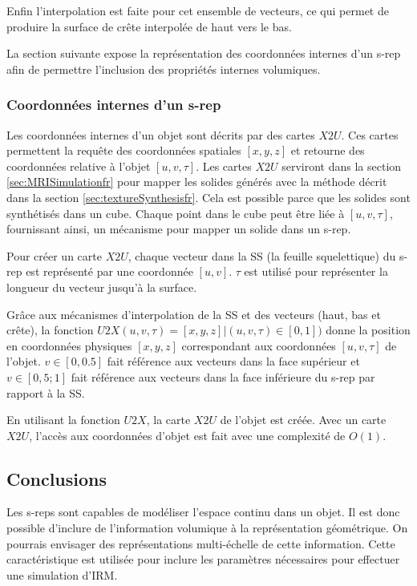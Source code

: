Enfin l'interpolation est faite pour cet ensemble de vecteurs, ce qui permet de produire 
la surface de crête interpolée de haut vers le bas.

La section suivante expose la représentation des coordonnées internes d'un s-rep afin de permettre 
l'inclusion des propriétés internes volumiques.

\subsubsection{Coordonnées internes d'un s-rep}
\label{sec:internalCoordinatesfr}

Les coordonnées internes d'un objet sont décrits par des cartes $X2U$.
Ces cartes permettent la requête des coordonnées spatiales $[x, y, z]$ et retourne des coordonnées relative à l'objet $[u, v, \tau]$.
Les cartes $X2U$ serviront dans la section \ref{sec:MRISimulationfr} pour mapper les solides générés avec la méthode décrit dans la section \ref{sec:textureSynthesisfr}.
Cela est possible parce que les solides sont synthétisés dans un cube. Chaque point dans le cube peut être liée à $[u, v, \tau]$, fournissant ainsi, un mécanisme pour mapper un solide dans un s-rep.

Pour créer un carte $X2U$, chaque vecteur dans la SS (la feuille squelettique) du s-rep  est représenté par une coordonnée $[u, v]$.
$\tau$ est utilisé pour représenter la longueur du vecteur jusqu'à la surface.

Grâce aux mécanismes d'interpolation de la SS et des vecteurs (haut, bas et crête), la fonction $U2X(u, v, \tau) = [x, y, z] | (u, v, \tau) \in [0, 1]) $ donne la position en coordonnées  physiques $[x, y, z]$ correspondant aux coordonnées $[u, v, \tau]$ de l'objet.
$v \in [0, 0.5] $ fait référence aux vecteurs dans la face supérieur et $v \in [0,5; 1]$ fait référence aux vecteurs dans la face inférieure du s-rep par rapport à la SS.

En utilisant la fonction $U2X$, la carte $X2U$ de l'objet est créée.
Avec un carte $X2U$, l'accès aux coordonnées d'objet est fait avec une complexité  de $O(1)$.

\subsection{Conclusions}
\label{sec:3dRepConclusionfr}

Les s-reps sont capables de modéliser l'espace continu dans un objet.
Il est donc possible d'inclure de l'information volumique à la représentation géométrique.
On pourrais envisager des représentations multi-échelle de cette information.
Cette caractéristique est utilisée pour inclure les paramètres nécessaires pour effectuer une simulation d'IRM.


